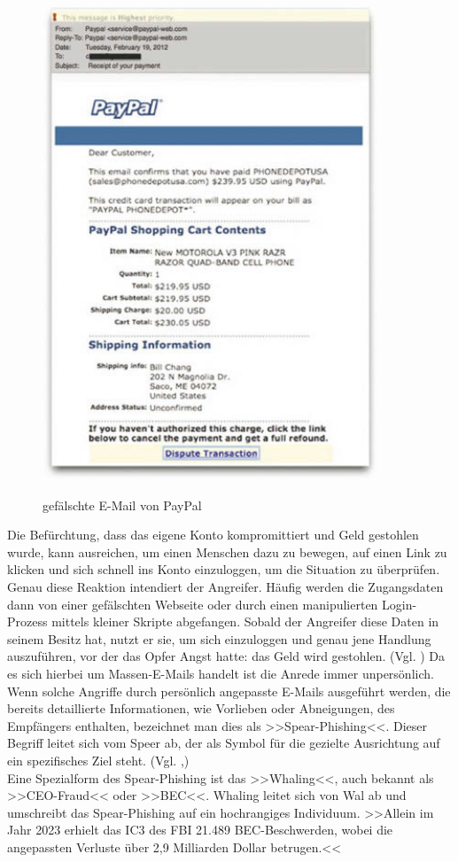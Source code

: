 \begin{figure}[h]
    \centering
\includegraphics[width = 10cm]{figures/ChristopherHadn_2014_Kapitel2WasIstSocialE_SocialEngineeringEntt.jpg}
\caption{gefälschte E-Mail von PayPal}
\cite{GrundformenDesSE}
\label{fig:PhishingPayPal}
\end{figure}

Die Befürchtung, dass das eigene Konto kompromittiert und Geld gestohlen wurde, kann ausreichen, um einen Menschen dazu zu bewegen, auf einen Link zu klicken und sich schnell ins Konto einzuloggen, um die Situation zu überprüfen. Genau diese Reaktion intendiert der Angreifer. Häufig werden die Zugangsdaten dann von einer gefälschten Webseite oder durch einen manipulierten Login-Prozess mittels kleiner Skripte abgefangen. Sobald der Angreifer diese Daten in seinem Besitz hat, nutzt er sie, um sich einzuloggen und genau jene Handlung auszuführen, vor der das Opfer Angst hatte: das Geld wird gestohlen. (Vgl. \cite{phishing}) Da es sich hierbei um Massen-E-Mails handelt ist die Anrede immer unpersönlich. \\
Wenn solche Angriffe durch persönlich angepasste E-Mails ausgeführt werden, die bereits detaillierte Informationen, wie Vorlieben oder Abneigungen, des Empfängers enthalten, bezeichnet man dies als >>Spear-Phishing<<. Dieser Begriff leitet sich vom Speer ab, der als Symbol für die gezielte Ausrichtung auf ein spezifisches Ziel steht. (Vgl. \cite{spear},\cite{phishing})\\
Eine Spezialform des Spear-Phishing ist das >>Whaling<<, auch bekannt als >>CEO-Fraud<< oder >>BEC<<. Whaling leitet sich von Wal ab und umschreibt das Spear-Phishing auf ein hochrangiges Individuum. >>Allein im Jahr 2023 erhielt das IC3 des FBI 21.489 BEC-Beschwerden, wobei die angepassten Verluste über 2,9 Milliarden Dollar betrugen.<<\cite[frei übersetzt]{fbi}


